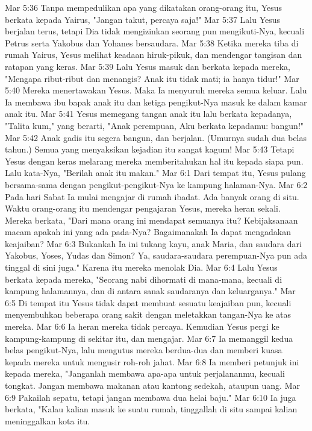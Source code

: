 Mar 5:36  Tanpa mempedulikan apa yang dikatakan orang-orang itu, Yesus berkata kepada Yairus, "Jangan takut, percaya saja!"
Mar 5:37  Lalu Yesus berjalan terus, tetapi Dia tidak mengizinkan seorang pun mengikuti-Nya, kecuali Petrus serta Yakobus dan Yohanes bersaudara.
Mar 5:38  Ketika mereka tiba di rumah Yairus, Yesus melihat keadaan hiruk-pikuk, dan mendengar tangisan dan ratapan yang keras.
Mar 5:39  Lalu Yesus masuk dan berkata kepada mereka, "Mengapa ribut-ribut dan menangis? Anak itu tidak mati; ia hanya tidur!"
Mar 5:40  Mereka menertawakan Yesus. Maka Ia menyuruh mereka semua keluar. Lalu Ia membawa ibu bapak anak itu dan ketiga pengikut-Nya masuk ke dalam kamar anak itu.
Mar 5:41  Yesus memegang tangan anak itu lalu berkata kepadanya, "Talita kum," yang berarti, "Anak perempuan, Aku berkata kepadamu: bangun!"
Mar 5:42  Anak gadis itu segera bangun, dan berjalan. (Umurnya sudah dua belas tahun.) Semua yang menyaksikan kejadian itu sangat kagum!
Mar 5:43  Tetapi Yesus dengan keras melarang mereka memberitahukan hal itu kepada siapa pun. Lalu kata-Nya, "Berilah anak itu makan."
Mar 6:1  Dari tempat itu, Yesus pulang bersama-sama dengan pengikut-pengikut-Nya ke kampung halaman-Nya.
Mar 6:2  Pada hari Sabat Ia mulai mengajar di rumah ibadat. Ada banyak orang di situ. Waktu orang-orang itu mendengar pengajaran Yesus, mereka heran sekali. Mereka berkata, "Dari mana orang ini mendapat semuanya itu? Kebijaksanaan macam apakah ini yang ada pada-Nya? Bagaimanakah Ia dapat mengadakan keajaiban?
Mar 6:3  Bukankah Ia ini tukang kayu, anak Maria, dan saudara dari Yakobus, Yoses, Yudas dan Simon? Ya, saudara-saudara perempuan-Nya pun ada tinggal di sini juga." Karena itu mereka menolak Dia.
Mar 6:4  Lalu Yesus berkata kepada mereka, "Seorang nabi dihormati di mana-mana, kecuali di kampung halamannya, dan di antara sanak saudaranya dan keluarganya."
Mar 6:5  Di tempat itu Yesus tidak dapat membuat sesuatu keajaiban pun, kecuali menyembuhkan beberapa orang sakit dengan meletakkan tangan-Nya ke atas mereka.
Mar 6:6  Ia heran mereka tidak percaya. Kemudian Yesus pergi ke kampung-kampung di sekitar itu, dan mengajar.
Mar 6:7  Ia memanggil kedua belas pengikut-Nya, lalu mengutus mereka berdua-dua dan memberi kuasa kepada mereka untuk mengusir roh-roh jahat.
Mar 6:8  Ia memberi petunjuk ini kepada mereka, "Janganlah membawa apa-apa untuk perjalananmu, kecuali tongkat. Jangan membawa makanan atau kantong sedekah, ataupun uang.
Mar 6:9  Pakailah sepatu, tetapi jangan membawa dua helai baju."
Mar 6:10  Ia juga berkata, "Kalau kalian masuk ke suatu rumah, tinggallah di situ sampai kalian meninggalkan kota itu.
